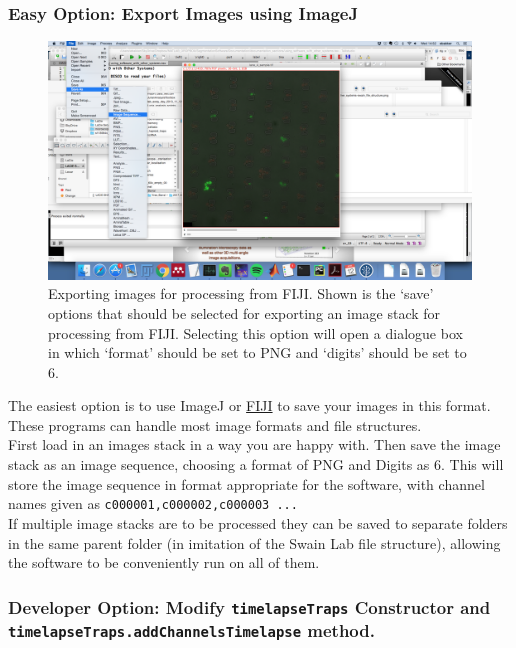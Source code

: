 \subsubsection{Easy Option: Export Images using ImageJ}
\begin{figure}
\centering
\includegraphics[width=1\linewidth]{documentation_images/other_systems-exporting_from_FIJI}
\caption[Exporting images for processing from FIJI]{Exporting images for processing from FIJI. Shown is the `save' options that should be selected for exporting an image stack for processing from FIJI. Selecting this option will open a dialogue box in which `format' should be set to PNG and `digits' should be set to 6.}
\label{fig:other_systems-exporting_from_FIJI}
\end{figure}


The easiest option is to use ImageJ or \href{https://fiji.sc/}{FIJI} to save your images in this format. These programs can handle most image formats and file structures.\\
First load in an images stack in a way you are happy with. Then save the image stack as an image sequence, choosing a format of PNG and Digits as 6. This will store the image sequence in format appropriate for the software, with channel names given as \texttt{c000001,c000002,c000003 ...}\\
If multiple image stacks are to be processed they can be saved to separate folders in the same parent folder (in imitation of the Swain Lab file structure), allowing the software to be conveniently run on all of them.

\subsubsection{Developer Option: Modify \texttt{timelapseTraps} Constructor and \texttt{timelapseTraps.addChannelsTimelapse} method.}